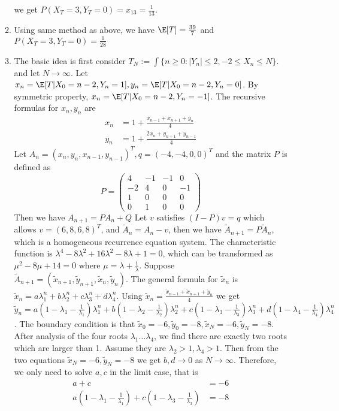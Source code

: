 \documentclass{article}
\begin{document}
\begin{enumerate}
\begin{enumerate}[label=(\roman*)]
we get $P(X_T=3,Y_T=0)=x_{13}=\frac{1}{13}$.
\item Using same method as above, we have $\E[T]=\frac{39}{7}$ and $P(X_T=3,Y_T=0)=\frac{1}{28}$
\item 
The basic idea is first consider
$T_N:=\int\{n\geq 0: |Y_n|\leq 2, -2\leq X_n \leq N \}$. and let $N \to \infty$.
Let $x_n=\E[T|X_0=n-2,Y_n=1], y_n=\E[T|X_0=n-2,Y_n=0]$.
By symmetric property, $x_n=\E[T|X_0=n-2,Y_n=-1]$.
The recursive formulas for $x_n, y_n$
are
\begin{align*}
    x_n &= 1 + \frac{x_{n-1} + x_{n+1}
    +y_n}{4}\\
    y_n &= 1 + \frac{2x_{n} + y_{n+1}+y_{n-1}}{4}
    \end{align*}
Let $A_{n} = (x_n, y_n, x_{n-1}, y_{n-1})^T,
q = (-4,-4,0,0)^T$ and the matrix $P$
is defined as
$$
P=
\begin{pmatrix}
4&-1&-1&0\\
-2&4&0&-1\\
1&0&0&0\\
0&1&0&0
\end{pmatrix}
$$
Then we have $A_{n+1}=PA_n + Q$
Let $v$ satisfies $(I-P)v=q$ which allows $v=(6,8,6,8)^T$, and $\widetilde{A}_n=A_n-v$, then we have
$\widetilde{A}_{n+1}=P\widetilde{A}_n$, which
is a homogeneous recurrence equation system.
The characteristic function is $\lambda^4-8\lambda^2+16\lambda^2-8\lambda+1=0$,
which can be transformed as
$\mu^2-8\mu+14=0$ where $\mu=\lambda+\frac{1}{\lambda}$.
Suppose $\widetilde{A}_{n+1}=(\tilde{x}_{n+1},
\tilde{y}_{n+1},\tilde{x}_{n},\tilde{y}_{n})$.
The general formula for $\tilde{x}_{n}$
is $\tilde{x}_{n} = a \lambda_1^n + b \lambda_2^n + c\lambda_3^n + d \lambda_4^n$.
Using $\tilde{x}_n = \frac{\tilde{x}_{n-1} + \tilde{x}_{n+1}
    +\tilde{y}_n}{4}$ we get
    $\tilde{y}_{n} = a (1-\lambda_1-\frac{1}{\lambda_1})\lambda_1^n + b (1-\lambda_2-\frac{1}{\lambda_2})\lambda_2^n + c(1-\lambda_3-\frac{1}{\lambda_3})\lambda_3^n + d (1-\lambda_4-\frac{1}{\lambda_4})\lambda_4^n$.
The boundary condition is that $\tilde{x}_0=-6,
\tilde{y}_0=-8,\tilde{x}_N=-6,
\tilde{y}_N=-8$. After analysis of the four
roots $\lambda_1\dots \lambda_4$,
we find there are exactly two roots which are larger than 1. Assume they are $\lambda_2>1,\lambda_4>1$.
Then from the two equations $\tilde{x}_N=-6,
\tilde{y}_N=-8$ we get $b,d\to 0$ as $N\to \infty$. Therefore, we only need to solve
$a,c$ in the limit case, that is
\begin{align*}
    a + c &= -6\\
    a(1-\lambda_1-\frac{1}{\lambda_1}) + c(1-\lambda_3-\frac{1}{\lambda_3})& = -8

\end{align*}
\end{enumerate}
\end{enumerate}
\end{document}
